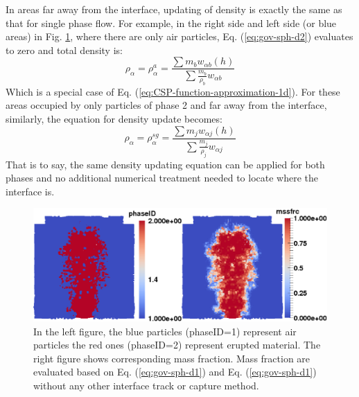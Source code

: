In areas far away from the interface, updating of density is exactly the same as that for single phase flow. For example, in the right side and left side (or blue areas) in Fig. \ref{fig:SPH-multiple-density}, where there are only air particles, Eq.  (\ref{eq:gov-sph-d2}) evaluates to zero and total density is:
\begin{equation}
\rho_{\alpha}=\rho_{\alpha}^a=\frac{\sum m_b w_{\alpha b} \left(h\right)}{\sum \frac{m_b}{\rho_b} w_{\alpha b}}
\end{equation}
Which is a special case of Eq. (\ref{eq:CSP-function-approximation-1d}). For these areas occupied by only particles of phase 2 and far away from the interface, similarly, the equation for density update becomes: 
\begin{equation}
\rho_{\alpha}=\rho_{\alpha}^{sg}=\frac{\sum m_j w_{\alpha j} \left(h\right)}{\sum \frac{m_j}{\rho_j} w_{\alpha j}}
\end{equation}
That is to say, the same density updating equation can be applied for both phases and no additional numerical treatment needed to locate where the interface is.

\begin{figure}
\center
\includegraphics[width=12cm]{Chapter-3/Figures/Interface}
\caption{In the left figure, the blue particles (phaseID=1) represent air particles the red ones (phaseID=2) represent erupted material. The right figure shows corresponding mass fraction. Mass fraction are evaluated based on Eq. (\ref{eq:gov-sph-d1}) and Eq. (\ref{eq:gov-sph-d1}) without any other interface track or capture method.}
\label{fig:SPH-multiple-density}
\end{figure}

